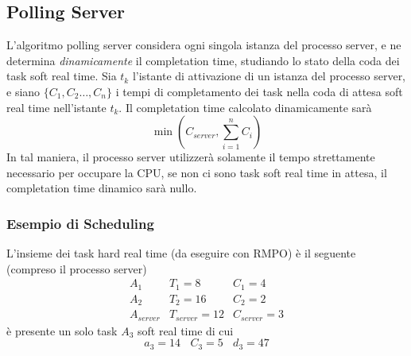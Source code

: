 \documentclass[10pt, letterpaper]{report}
\begin{document}
\subsection{Polling Server}
L'algoritmo polling server considera ogni singola istanza del processo server, e ne determina \textit{dinamicamente} il completation time, studiando lo stato della coda dei task soft real time.\acc 
Sia $t_k$ l'istante di attivazione di un istanza del processo server, e siano $\{C_1,C_2\dots , C_n\}$ i tempi di completamento dei task nella coda di attesa soft real time nell'istante $t_k$. Il completation time calcolato dinamicamente sarà 
$$ \min(C_{server}, \sum_{i=1}^n C_i)$$
In tal maniera, il processo server utilizzerà solamente il tempo strettamente necessario per occupare la CPU, se non ci sono task soft real time in attesa, il completation time dinamico sarà nullo.
\subsubsection{Esempio di Scheduling}
L'insieme dei task hard real time (da eseguire con RMPO) è il seguente (compreso il processo server) 
$$ \begin{matrix}
A_1 & T_1 = 8 & C_1 = 4 \\ 
A_2 & T_2 = 16 & C_2 = 2 \\ 
A_{server} & T_{server}=12 & C_{server} = 3\end{matrix}
$$
è presente un solo task $A_3$ soft real time di cui 
$$ a_3=14 \ \ \ \ C_3 = 5 \ \ \ \ d_3 = 47$$
\end{document}

